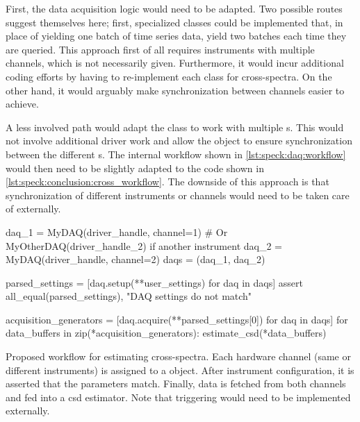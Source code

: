 First, the data acquisition logic would need to be adapted.
Two possible routes suggest themselves here; first, specialized  classes could be implemented that, in place of yielding one batch of time series data, yield two batches each time they are queried.
This approach first of all requires instruments with multiple channels,
which is not necessarily given.
Furthermore, it would incur additional coding efforts by having to re-implement each  class for cross-spectra.
On the other hand, it would arguably make synchronization between channels easier to achieve.

A less involved path would adapt the  class to work with multiple s.
This would not involve additional driver work
and allow the  object to ensure synchronization between the different s.
The internal workflow shown in \cref{lst:speck:daq:workflow} would then need to be slightly adapted to the code shown in \cref{lst:speck:conclusion:cross_workflow}.
The downside of this approach is that synchronization of different instruments or channels would need to be taken care of externally.

\begin{listing}[htpb]
    \begin{pycode}
        daq_1 = MyDAQ(driver_handle, channel=1)
        # Or MyOtherDAQ(driver_handle_2) if another instrument
        daq_2 = MyDAQ(driver_handle, channel=2)
        daqs = (daq_1, daq_2)

        parsed_settings = [daq.setup(**user_settings) for daq in daqs]
        assert all_equal(parsed_settings), "DAQ settings do not match"

        acquisition_generators = [daq.acquire(**parsed_settings[0])
                                  for daq in daqs]
        for data_buffers in zip(*acquisition_generators):
            estimate_csd(*data_buffers)
    \end{pycode}
    \caption[Proposed  workflow for cross-spectra]{
        Proposed  workflow for estimating cross-spectra.
        Each hardware channel (same or different instruments) is assigned to a  object.
        After instrument configuration, it is asserted that the parameters match.
        Finally, data is fetched from both channels and fed into a \gls{csd} estimator.
        Note that triggering would need to be implemented externally.
    }
    \label{lst:speck:conclusion:cross_workflow}
\end{listing}

